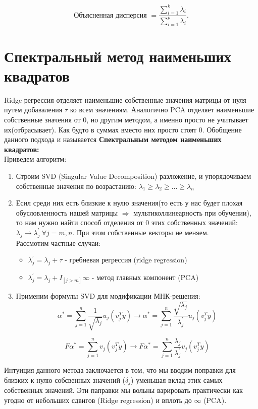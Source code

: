 $$
    \text { Объясненная дисперсия }=\frac{\sum_{i=1}^k \lambda_i}{\sum_{i=1}^p \lambda_i} \text {. }
$$

\section{Спектральный метод наименьших квадратов}

Ridge регрессия отделяет наименьшие собственные значения матрицы от нуля путем добаваления $\tau$ ко всем значениям. Аналогично PCA отделяет наименьшие собственные значения от 0, но другим методом, а именно просто не учитывает их(отбрасывает). Как будто в суммах вместо них просто стоят 0. Обобщение данного подхода и называется \textbf{Спектральным методом наименьших квадратов: } \\
Приведем алгоритм:
\begin{enumerate}
    \item Строим SVD (Singular Value Decomposition) разложение, и упорядочиваем собственные значения по возрастанию: $\lambda_1 \geq \lambda_2 \geq \dots \geq \lambda_n$
    \item Есил среди них есть близкие к нулю значения(то есть у нас будет плохая обусловленность нашей матрицы $\Rightarrow$ мультиколлинеарность при обучении), то нам нужно найти способ отделения от 0 этих собственных значений: $\lambda_j \rightarrow \lambda^{'}_j \ \forall j = \overline{m,n}$. При этом собственные векторы не меняем. \\
          Рассмотим частные случаи:
          \begin{itemize}
              \item $\lambda^{'}_j = \lambda_j + \tau$ - гребневая регрессия (ridge regression)
              \item $\lambda^{'}_j = \lambda_j + I_{[j > m]}\infty$ - метод главных компонент (PCA)
          \end{itemize}

    \item Применим формулы SVD для модификации МНК-решения: \\
          $$\alpha^{*} = \sum_{j =1}^{n} \frac{1}{\sqrt{\lambda_j}} u_j(v_j^Ty)  \rightarrow \alpha^{*} = \sum_{j =1}^{n} \frac{\sqrt{\lambda_j}}{\lambda^{'}_j} u_j(v_j^Ty)$$

          $$F\alpha^{*} = \sum_{j =1}^{n} v_j(v_j^Ty) \rightarrow F\alpha^{*} = \sum_{j =1}^{n} \frac{\lambda_j}{\lambda^{'}_j} v_j(v_j^Ty)
          $$
\end{enumerate}
Интуиция данного метода заключается в том, что мы вводим поправки для близких к нулю собсвенных значений ($\delta_j$) уменьшая вклад этих самых собственных значений. Эти паправки мы вольны варировать практически как угодно от небольших сдвигов (Ridge regression) и вплоть до $\infty$ (PCA).

